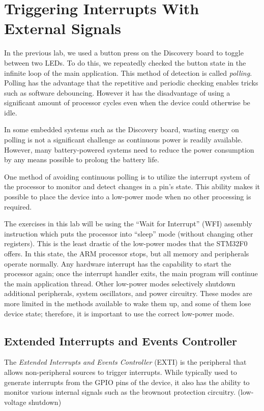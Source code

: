 \documentclass[11pt,fleqn]{book} %
\begin{document}
\section{Triggering Interrupts With External Signals}

In the previous lab, we used a button press on the Discovery board to toggle between two LEDs. To do this, we repeatedly checked the button state in the infinite loop of the main application. This method of detection is called \textit{polling}. Polling has the advantage that the repetitive and periodic checking enables tricks such as software debouncing. However it has the disadvantage of using a significant amount of processor cycles even when the device could otherwise be idle. 

In some embedded systems such as the Discovery board, wasting energy on polling is not a significant challenge as continuous power is readily available. However, many battery-powered systems need to reduce the power consumption by any means possible to prolong the battery life.

One method of avoiding continuous polling is to utilize the interrupt system of the processor to monitor and detect changes in a pin's state. This ability makes it possible to place the device into a low-power mode when no other processing is required. 

The exercises in this lab will be using the ``Wait for Interrupt'' (WFI) assembly instruction which puts the processor into ``sleep'' mode (without changing other registers). This is the least drastic of the low-power modes that the STM32F0 offers. In this state, the ARM processor stops, but all memory and peripherals operate normally. Any hardware interrupt has the capability to start the processor again; once the interrupt handler exits, the main program will continue the main application thread. Other low-power modes selectively shutdown additional peripherals, system oscillators, and power circuitry. These modes are more limited in the methods available to wake them up, and some of them lose device state; therefore, it is important to use the correct low-power mode.  

\subsection{Extended Interrupts and Events Controller} \label{exti}

The \textit{Extended Interrupts and Events Controller} (EXTI) is the peripheral that allows non-peripheral sources to trigger interrupts. While typically used to generate interrupts from the GPIO pins of the device, it also has the ability to monitor various internal signals such as the brownout protection circuitry. (low-voltage shutdown)
\end{document}
